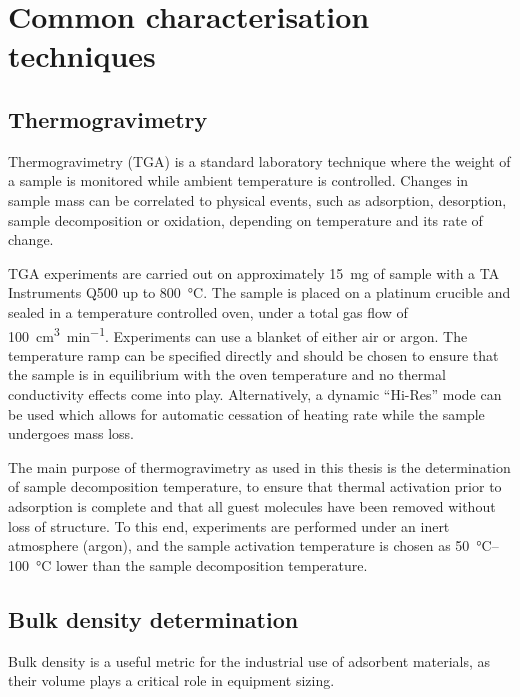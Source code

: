 
\graphicspath{ {\thisappx/figures/} }

\chapter{Common characterisation techniques}\label{appx:char}

\section{Thermogravimetry}\label{appx:char:TGA}

Thermogravimetry (TGA) is a standard laboratory technique where the
weight of a sample is monitored while ambient temperature is controlled.
Changes in sample mass can be correlated to physical events, such
as adsorption, desorption, sample decomposition or oxidation, depending
on temperature and its rate of change.

TGA experiments are carried out on approximately \SI{15}{\milli\gram} of 
sample with a TA Instruments Q500 up to \SI{800}{\degreeCelsius}.
The sample is placed on a platinum crucible and sealed in a temperature
controlled oven, under a total gas flow of \SI{100}{\cm\cubed\per\minute}.
Experiments can use a blanket of either air or argon. The temperature
ramp can be specified directly and should be chosen to ensure 
that the sample is in equilibrium with the oven temperature and no
thermal conductivity effects come into play. Alternatively,
a dynamic “Hi-Res” mode can be used which allows for automatic
cessation of heating rate while the sample undergoes mass loss.

The main purpose of thermogravimetry as used in this thesis is the
determination of sample decomposition temperature, to ensure
that thermal activation prior to adsorption is complete and 
that all guest molecules have been removed without loss of
structure. To this end, experiments are performed under an inert
atmosphere (argon), and the sample activation temperature is chosen
as \SIrange{50}{100}{\degreeCelsius} lower than the sample 
decomposition temperature.

\section{Bulk density determination}\label{appx:char:bulkdensity}

Bulk density is a useful metric for the industrial use of adsorbent
materials, as their volume plays a critical role in equipment sizing.

